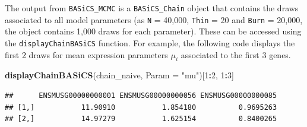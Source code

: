 \documentclass[9pt,a4paper,]{extarticle}
\newenvironment{Shaded}{\begin{snugshade}}{\end{snugshade}}
\newcommand{\DataTypeTok}[1]{\textcolor[rgb]{0.13,0.29,0.53}{#1}}
\newcommand{\DecValTok}[1]{\textcolor[rgb]{0.00,0.00,0.81}{#1}}
\newcommand{\KeywordTok}[1]{\textcolor[rgb]{0.13,0.29,0.53}{\textbf{#1}}}
\newcommand{\NormalTok}[1]{#1}
\newcommand{\OperatorTok}[1]{\textcolor[rgb]{0.81,0.36,0.00}{\textbf{#1}}}
\newcommand{\StringTok}[1]{\textcolor[rgb]{0.31,0.60,0.02}{#1}}
\begin{document}
The output from \texttt{BASiCS\_MCMC} is a \texttt{BASiCS\_Chain} object that contains the
draws associated to all model parameters (as \texttt{N} = 40,000, \texttt{Thin} = 20 and
\texttt{Burn} = 20,000, the object contains 1,000 draws for each parameter).
These can be accessed using the \texttt{displayChainBASiCS} function.
For example, the following code displays the first 2 draws for mean
expression parameters \(\mu_i\) associated to the first 3 genes.

\begin{Shaded}
\begin{Highlighting}[]
\KeywordTok{displayChainBASiCS}\NormalTok{(chain_naive, }\DataTypeTok{Param =} \StringTok{"mu"}\NormalTok{)[}\DecValTok{1}\OperatorTok{:}\DecValTok{2}\NormalTok{, }\DecValTok{1}\OperatorTok{:}\DecValTok{3}\NormalTok{]}
\end{Highlighting}
\end{Shaded}

\begin{verbatim}
##      ENSMUSG00000000001 ENSMUSG00000000056 ENSMUSG00000000085
## [1,]           11.90910           1.854180          0.9695263
## [2,]           14.97279           1.625154          0.8400265
\end{verbatim}

{\small}
\end{document}
